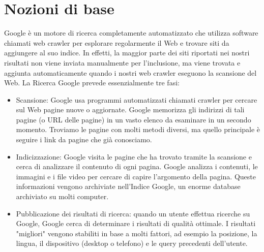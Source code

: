 \documentclass[a4paper]{extarticle}
\begin{document}
\section{Nozioni di base}
Google è un motore di ricerca completamente automatizzato che utilizza software chiamati web crawler per esplorare regolarmente il Web e trovare siti da aggiungere al suo indice. In effetti, la maggior parte dei siti riportati nei nostri risultati non viene inviata manualmente per l'inclusione, ma viene trovata e aggiunta automaticamente quando i nostri web crawler eseguono la scansione del Web. La Ricerca Google prevede essenzialmente tre fasi:
\begin{itemize}
\item Scansione: Google usa programmi automatizzati chiamati crawler per cercare sul Web pagine nuove o aggiornate. Google memorizza gli indirizzi di tali pagine (o URL delle pagine) in un vasto elenco da esaminare in un secondo momento. Troviamo le pagine con molti metodi diversi, ma quello principale è seguire i link da pagine che già conosciamo.
\item Indicizzazione: Google visita le pagine che ha trovato tramite la scansione e cerca di analizzare il contenuto di ogni pagina. Google analizza i contenuti, le immagini e i file video per cercare di capire l'argomento della pagina. Queste informazioni vengono archiviate nell'Indice Google, un enorme database archiviato su molti computer.
\item Pubblicazione dei risultati di ricerca: quando un utente effettua ricerche su Google, Google cerca di determinare i risultati di qualità ottimale. I risultati "migliori" vengono stabiliti in base a molti fattori, ad esempio la posizione, la lingua, il dispositivo (desktop o telefono) e le query precedenti dell'utente. 
\end{itemize}
\end{document}
